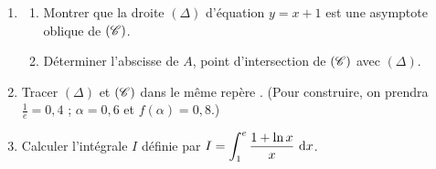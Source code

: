 \begin{description}
\begin{enumerate}
\begin{enumerate}
                                    \item Dresser le tableau de variation de $f$.
                              \end{enumerate}
                        \item \begin{enumerate}
                                    \item Montrer que la droite $(\Delta)$ d'\'equation $y = x+1$ est une asymptote oblique
                                          de $(\mathscr{C})$.
                                    \item D\'eterminer l'abscisse de $A$, point d'intersection de $(\mathscr{C})$ avec $(\Delta)$.
                              \end{enumerate}
                        \item Tracer $(\Delta)$ et $(\mathscr{C})$ dans le m\^eme rep\`ere \Oij .
                              (Pour construire, on prendra $\frac{1}{e} = 0,4$ ; $\alpha = 0,6$ et $f(\alpha) = 0,8$.)
                        \item Calculer l'int\'egrale $I$ d\'efinie par 
                              $\displaystyle{
                                    I = \int_{1}^{e} \frac{1+\ln x}{x} ~\mathrm{d}x}$.
                  \end{enumerate}
      \end{description}








